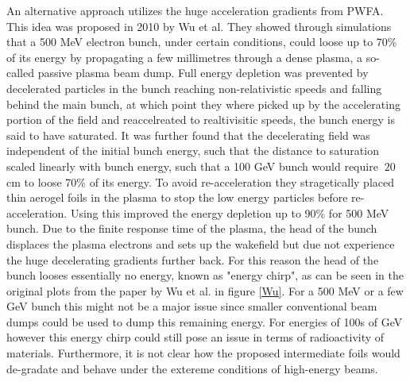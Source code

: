 An alternative approach utilizes the huge acceleration gradients from PWFA. This idea was proposed in 2010 by Wu et al. They showed through simulations that a 500 MeV electron bunch, under certain conditions, could loose up to 70\% of its energy by propagating a few millimetres through a dense plasma, a so-called passive plasma beam dump. Full energy depletion was prevented by decelerated particles in the bunch reaching non-relativistic speeds and falling behind the main bunch, at which point they where picked up by the accelerating portion of the field and reaccelreated to realtivisitic speeds, the bunch energy is said to have saturated. It was further found that the decelerating field was independent of the initial bunch energy, such that the distance to saturation scaled linearly with bunch energy, such that a 100 GeV bunch would require $~20$ cm to loose 70\% of its energy. To avoid re-acceleration they stragetically placed thin aerogel foils in the plasma to stop the low energy particles before re-acceleration. Using this improved the energy depletion up to 90\% for 500 MeV bunch.  Due to the finite response time of the plasma, the head of the bunch displaces the plasma electrons and sets up the wakefield but due not experience the huge decelerating gradients further back. For this reason the head of the bunch looses essentially no energy, known as "energy chirp", as can be seen in the original plots from the paper by Wu et al.  in figure \ref{Wu}. For a 500 MeV or a few GeV bunch this might not be a major issue since smaller conventional beam dumps could be used to dump this remaining energy. For energies of 100s of GeV however this energy chirp could still pose an issue in terms of radioactivity of materials. Furthermore, it is not clear how the proposed intermediate foils would de-gradate and behave under the extereme conditions of high-energy beams.\\
